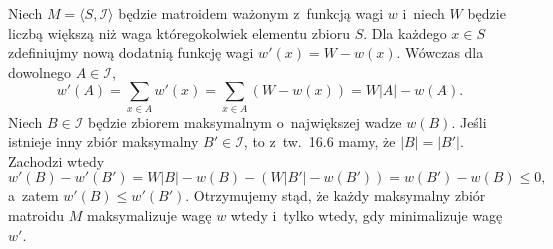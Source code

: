 \exercise %
Niech $M=\langle S,\mathcal{I}\rangle$ będzie matroidem ważonym z~funkcją wagi $w$ i~niech $W$ będzie liczbą większą niż waga któregokolwiek elementu zbioru $S$.
Dla każdego $x\in S$ zdefiniujmy nową dodatnią funkcję wagi $w'(x)=W-w(x)$.
Wówczas dla dowolnego $A\in\mathcal{I}$,
\[
	w'(A) = \sum_{x\in A}w'(x) = \sum_{x\in A}(W-w(x)) = W|A|-w(A).
\]
Niech $B\in\mathcal{I}$ będzie zbiorem maksymalnym o~największej wadze $w(B)$.
Jeśli istnieje inny zbiór maksymalny $B'\in\mathcal{I}$, to z~tw.\ 16.6 mamy, że $|B|=|B'|$.
Zachodzi wtedy
\[
	w'(B)-w'(B') = W|B|-w(B)-(W|B'|-w(B')) = w(B')-w(B) \le 0,
\]
a~zatem $w'(B)\le w'(B')$.
Otrzymujemy stąd, że każdy maksymalny zbiór matroidu $M$ maksymalizuje wagę $w$ wtedy i~tylko wtedy, gdy minimalizuje wagę $w'$.
